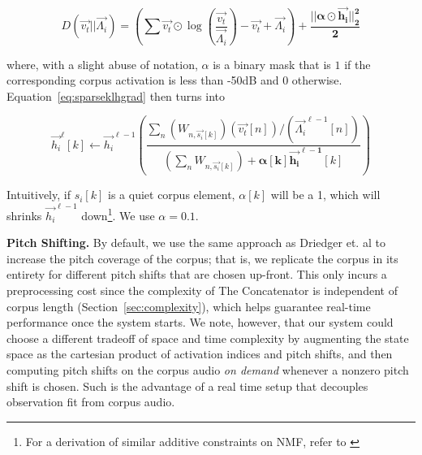 \documentclass{article}
\begin{document}
\begin{equation}
    \label{eq:kllossalpha}
    D(\vec{v_t} || \vec{\Lambda_i}) = \left( \sum \vec{v_t} \odot \log \left( \frac{\vec{v_t}}{\vec{\Lambda_i}} \right) - \vec{v_t} + \vec{\Lambda_i} \right) + \boldsymbol{ \frac{||\alpha \odot \vec{h_i}||_2^2 }{2} }
    \end{equation}

where, with a slight abuse of notation, $\alpha$ is a binary mask that is $1$ if the corresponding corpus activation is less than -50dB and $0$ otherwise.  Equation~\ref{eq:sparseklhgrad} then turns into 

\begin{equation}
    \label{eq:sparseklhgradalpha}
    \vec{h_i}^{\ell}[k]  \gets \vec{h_i}^{\ell-1} \left(  \frac{\sum_n (W_{n, \vec{s_i}[k]}) (\vec{v_t}[n]) / (\vec{\Lambda_i}^{\ell-1}[n]) }{ (\sum_{n} W_{n, \vec{s_i}[k]}) + \boldsymbol{ \alpha[k] \vec{h_i}^{\ell-1}}[k]} \right)
\end{equation}

Intuitively, if $s_i[k]$ is a quiet corpus element, $\alpha[k]$ will be a 1, which will shrinks $\vec{h_i}^{\ell-1}$ down\footnote{For a derivation of similar additive constraints on NMF, refer to \cite{virtanen2007monaural}}.  We use $\alpha=0.1$.




\textbf{Pitch Shifting.} By default, we use the same approach as Driedger et. al to increase the pitch coverage of the corpus; that is, we replicate the corpus in its entirety for different pitch shifts that are chosen up-front.  This only incurs a preprocessing cost since the complexity of The Concatenator is independent of corpus length (Section~\ref{sec:complexity}), which helps guarantee real-time performance once the system starts.  We note, however, that our system could choose a different tradeoff of space and time complexity by augmenting the state space as the cartesian product of activation indices and pitch shifts, and then computing pitch shifts on the corpus audio {\em on demand} whenever a nonzero pitch shift is chosen.  Such is the advantage of a real time setup that decouples observation fit from corpus audio.
\end{document}
